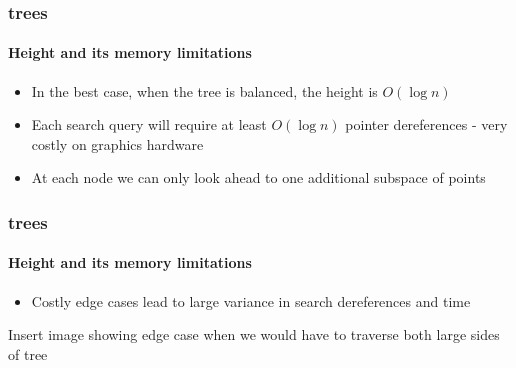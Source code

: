 \begin{frame}
  \frametitle{\kd trees}
  \framesubtitle{Height and its memory limitations}

  \begin{itemize}
    \item In the best case, when the tree is balanced, the height is $O(\log n)$
    \item Each search query will require at least $O(\log n )$ pointer dereferences - very costly on graphics 
      hardware
    \item At each node we can only look ahead to one additional subspace of points
  \end{itemize}
\end{frame}

\begin{frame}
  \frametitle{\kd trees}
  \framesubtitle{Height and its memory limitations}

  \begin{itemize}
    \item Costly edge cases lead to large variance in search dereferences and time
  \end{itemize}

  Insert image showing edge case when we would have to traverse both large sides of tree
\end{frame}
